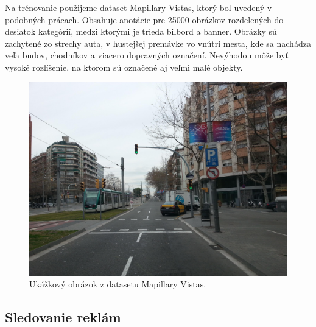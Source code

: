 Na trénovanie použijeme dataset Mapillary Vistas, ktorý bol uvedený v podobných prácach. Obsahuje anotácie pre 25000 obrázkov rozdelených do desiatok kategórií, medzi ktorými je trieda bilbord a banner. Obrázky sú zachytené zo strechy auta, v hustejšej premávke vo vnútri mesta, kde sa nachádza veľa budov, chodníkov a viacero dopravných označení. Nevýhodou môže byť vysoké rozlíšenie, na ktorom sú označené aj veľmi malé objekty.


\begin{figure}[ht]
    \centering
    \includegraphics[width=1\textwidth]{images/02/mapillar.jpg}
    \caption{Ukážkový obrázok z datasetu Mapillary Vistas.}
    \label{img:dataset}
\end{figure}

\subsection{Sledovanie reklám}

